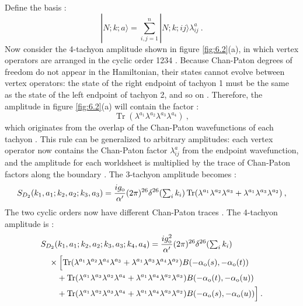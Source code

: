 Define the basis :
\begin{equation}
	|N ; k ; a\rangle=\sum_{i, j=1}^{n}|N ; k ; i j\rangle \lambda_{i j}^{a}  \:. \label{6.5.3}
\end{equation}
Now consider the 4-tachyon amplitude shown in figure \ref{fig:6.2}(a), in which vertex operators are arranged in the cyclic order 1234 . Because Chan-Paton degrees of freedom do not appear in the Hamiltonian, their states cannot evolve between vertex operators: the state of the right endpoint of tachyon 1 must be the same as the state of the left endpoint of tachyon 2, and so on . Therefore, the amplitude in figure \ref{fig:6.2}(a) will contain the factor :
\begin{equation}
	\operatorname{Tr}(\lambda^{a_{1}} \lambda^{a_{2}} \lambda^{a_{3}} \lambda^{a_{4}}) \:, \label{6.5.4}
\end{equation}
which originates from the overlap of the Chan-Paton wavefunctions of each tachyon . This rule can be generalized to arbitrary amplitudes: each vertex operator now contains the Chan-Paton factor $\lambda_{i j}^{a}$ from the endpoint wavefunction, and the amplitude for each worldsheet is multiplied by the trace of Chan-Paton factors along the boundary . The 3-tachyon amplitude becomes :
\begin{align}
	S_{D_{2}}(k_{1}, a_{1} ; k_{2}, a_{2} ; k_{3}, a_{3})= 
	\frac{i g_{\mathrm{o}}}{\alpha^{\prime}}(2 \pi)^{26} \delta^{26}({\textstyle\sum_{i} k_{i}}) 
	\operatorname{Tr}(\lambda^{a_{1}} \lambda^{a_{2}} \lambda^{a_{3}}+\lambda^{a_{1}} \lambda^{a_{3}} \lambda^{a_{2}}) \:, \label{6.5.5}
\end{align}
The two cyclic orders now have different Chan-Paton traces . The 4-tachyon amplitude is :
\begin{align}
	&S_{D_{2}}(k_{1}, a_{1} ; k_{2}, a_{2} ; k_{3}, a_{3} ; k_{4}, a_{4})
	=\frac{i g_{\mathrm{o}}^{2}}{\alpha^{\prime}}(2 \pi)^{26} \delta^{26}({\textstyle \sum_{i} k_{i}}) \nonumber \\
	&\quad \times \Bigl[\operatorname{Tr}(\lambda^{a_{1}} \lambda^{a_{2}} \lambda^{a_{4}} \lambda^{a_{3}}
	+\lambda^{a_{1}} \lambda^{a_{3}} \lambda^{a_{4}} \lambda^{a_{2}}) B(-\alpha_{\mathrm{o}}(s),-\alpha_{\mathrm{o}}(t)) \nonumber  \\
	&\qquad+\operatorname{Tr}(\lambda^{a_{1}} \lambda^{a_{3}} \lambda^{a_{2}} \lambda^{a_{4}}
	+\lambda^{a_{1}} \lambda^{a_{4}} \lambda^{a_{2}} \lambda^{a_{3}}) B(-\alpha_{\mathrm{o}}(t),-\alpha_{\mathrm{o}}(u))\nonumber \\
	&\qquad+\operatorname{Tr}(\lambda^{a_{1}} \lambda^{a_{2}} \lambda^{a_{3}} \lambda^{a_{4}}
	+\lambda^{a_{1}} \lambda^{a_{4}} \lambda^{a_{3}} \lambda^{a_{2}}) 
	B(-\alpha_{\mathrm{o}}(s),-\alpha_{\mathrm{o}}(u))\Bigr] \:. \label{6.5.6}
\end{align}
